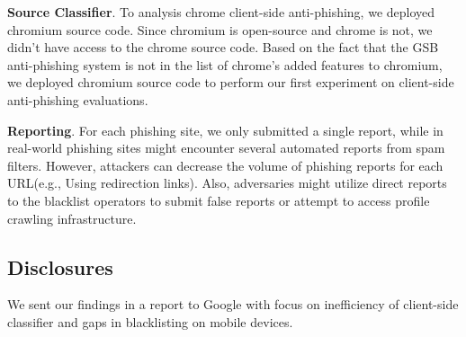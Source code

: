 \textbf{Source Classifier}. To analysis chrome client-side anti-phishing, we deployed chromium source code. Since chromium is open-source and chrome is not, we didn't have access to the chrome source code. Based on the fact that the GSB anti-phishing system is not in the list of chrome's added features to chromium, we deployed chromium source code to perform our first experiment on client-side anti-phishing evaluations. 

\textbf{Reporting}. For each phishing site, we only submitted a single report, while in real-world phishing sites might encounter several automated reports from spam filters. However,  attackers can decrease the volume of phishing reports for each URL(e.g., Using redirection links).
Also, adversaries might utilize direct reports to the blacklist
operators to submit false reports or attempt to access profile crawling infrastructure.

\subsection{Disclosures}

We sent our findings in a report to Google with focus on inefficiency of client-side classifier and gaps in blacklisting on mobile devices. 
